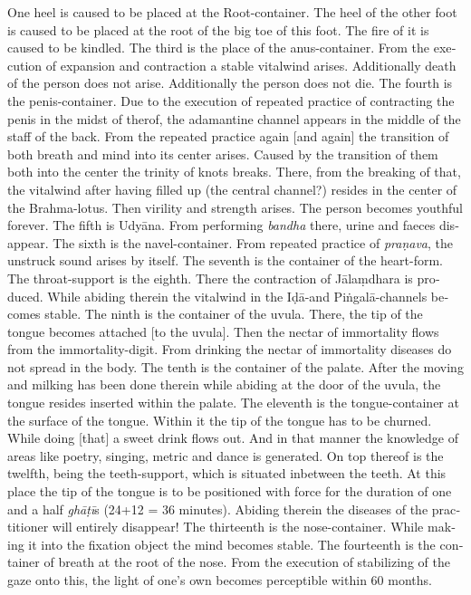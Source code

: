 \begin{otherlanguage}{english}
\begin{tlate}
 One heel is caused to be placed at the Root-container. The heel of the other foot is caused to be placed at the root of the big toe of this foot.
 The fire of it is caused to be kindled.
 The third is the place of the anus-container. From the execution of expansion and contraction a stable vitalwind arises. Additionally death of the person does not arise. Additionally the person does not die.
 The fourth is the penis-container. Due to the execution of repeated practice of contracting the penis in the midst of therof, the adamantine channel appears in the middle of the staff of the back. From the repeated practice again [and again] the transition of both breath and mind into its center arises. Caused by the transition of them both into the center the trinity of knots breaks. There, from the breaking of that, the vitalwind after having filled up (the central channel?) resides in the center of the Brahma-lotus. Then virility and strength arises. The person becomes youthful forever.
 The fifth is Udyāna. From performing \textit{bandha} there, urine and faeces disappear.
 The sixth is the navel-container. From repeated practice of \textit{praṇava}, the unstruck sound arises by itself.
 The seventh is the container of the heart-form.
 The throat-support is the eighth. There the contraction of Jālaṃdhara is produced. While abiding therein the vitalwind in the Iḍā-and Piṅgalā-channels becomes stable.
 The ninth is the container of the uvula. There, the tip of the tongue becomes attached [to the uvula]. Then the nectar of immortality flows from the immortality-digit. From drinking the nectar of immortality diseases do not spread in the body.
 The tenth is the container of the palate. After the moving and milking has been done therein while abiding at the door of the uvula, the tongue resides inserted within the palate.
 The eleventh is the tongue-container at the surface of the tongue. Within it the tip of the tongue has to be churned. While doing [that] a sweet drink flows out. And in that manner the knowledge of areas like poetry, singing, metric and dance is generated.
 On top thereof is the twelfth, being the teeth-support, which is situated inbetween the teeth. At this place the tip of the tongue is to be positioned with force for the duration of one and a half \textit{ghāṭī}s (24+12 = 36 minutes). Abiding therein the diseases of the practitioner will entirely disappear!
 The thirteenth is the nose-container. While making it into the fixation object the mind becomes stable.
 The fourteenth is the container of breath at the root of the nose. From the execution of stabilizing of the gaze onto this, the light of one's own becomes perceptible within 60 months.

\end{tlate}
\end{otherlanguage}
